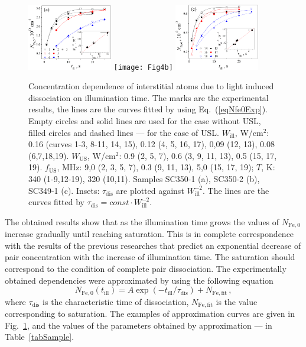 \documentclass[%
 aip,jap,
 amsmath,amssymb,
 reprint,%
]{revtex4-1}
\begin{document}
\begin{figure}
\includegraphics[width=0.33\textwidth]{Fig4a}%
\texttt{[image: Fig4b]}%
\includegraphics[width=0.33\textwidth]{Fig4c}%
\caption{\label{Fig:Nfe_till}
Concentration dependence of interstitial atoms due to light induced dissociation on illumination time.
The marks are the experimental results, the lines are the curves  fitted by using Eq.~(\ref{eqNfe0Exp}).
Empty circles and solid lines are used for  the case without USL,
filled circles and dashed lines --- for the case of USL.
$W_\mathrm{ill}$, W/cm$^2$: 0.16 (curves 1-3, 8-11, 14, 15),
0.12 (4, 5, 16, 17), 0,09 (12, 13), 0.08 (6,7,18,19).
$W_\mathrm{US}$, W/cm$^2$:
0.9 (2, 5, 7), 0.6 (3, 9, 11, 13), 0.5 (15, 17, 19).
$f_\mathrm{US}$, MHz:
9,0 (2, 3, 5, 7), 0.3 (9, 11, 13), 5,0 (15, 17, 19);
$T$, K:
340 (1-9,12-19), 320 (10,11).
Samples SC350-1 (a), SC350-2 (b), SC349-1 (c).
Insets: $\tau_\mathrm{dis}$ are plotted against $W_\mathrm{ill}^{-2}$.
The lines are the curves fitted by $\tau_\mathrm{dis}=const\cdot W_\mathrm{ill}^{-2}$.
}
\end{figure}


The obtained results show that as the illumination time grows
the values of $N_\mathrm{Fe,0}$ increase gradually until reaching saturation.
This is in complete correspondence with the results of the previous researches \cite{FeBLight2,FeBAssJAP2014,FeBKin2019}
that predict an exponential decrease of pair concentration with the increase of illumination time.
The saturation should correspond to the condition of complete pair dissociation.
The experimentally obtained dependencies were approximated by using the following equation
\begin{equation}
\label{eqNfe0Exp}
N_\mathrm{Fe,0}(t_\mathrm{ill})=A\exp(-t_\mathrm{ill}/\tau_\mathrm{dis})
+N_\mathrm{Fe,fit}\,,
\end{equation}
where
$\tau_\mathrm{dis}$ is the characteristic time of dissociation,
$N_\mathrm{Fe,fit}$ is the value corresponding to saturation.
The examples of approximation curves are given in Fig.~\ref{Fig:Nfe_till},
and the values of the parameters obtained by approximation --- in Table~\ref{tabSample}.
\end{document}
